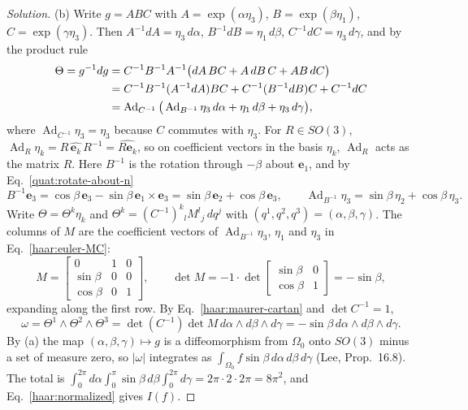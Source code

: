 \begin{proof}[Solution]
(b) Write $g=ABC$ with $A=\exp(\alpha\eta_3)$, $B=\exp(\beta\eta_1)$,
$C=\exp(\gamma\eta_3)$. Then $A^{-1}dA=\eta_3\,d\alpha$,
$B^{-1}dB=\eta_1\,d\beta$, $C^{-1}dC=\eta_3\,d\gamma$, and by the product
rule
\begin{align}
 \Theta=g^{-1}dg
 &=C^{-1}B^{-1}A^{-1}\big(dA\,BC+A\,dB\,C+AB\,dC\big)\notag\\
 &=C^{-1}B^{-1}(A^{-1}dA)BC+C^{-1}(B^{-1}dB)C+C^{-1}dC\notag\\
 &=\operatorname{Ad}_{C^{-1}}\big(\operatorname{Ad}_{B^{-1}}\eta_3\,d\alpha
   +\eta_1\,d\beta+\eta_3\,d\gamma\big),\label{haar:euler-MC}
\end{align}
where $\operatorname{Ad}_{C^{-1}}\eta_3=\eta_3$ because $C$ commutes with
$\eta_3$. For $R\in SO(3)$, $\operatorname{Ad}_R\eta_k=R\,\widehat{\mathbf e_k}
\,R^{-1}=\widehat{R\mathbf e_k}$, so on coefficient vectors in the basis
$\eta_k$, $\operatorname{Ad}_R$ acts as the matrix $R$. Here $B^{-1}$ is the
rotation through $-\beta$ about $\mathbf e_1$, and by
Eq.~\eqref{quat:rotate-about-n}
\begin{equation}
 B^{-1}\mathbf e_3=\cos\beta\,\mathbf e_3-\sin\beta\,\mathbf e_1\times\mathbf e_3
 =\sin\beta\,\mathbf e_2+\cos\beta\,\mathbf e_3,
 \qquad \operatorname{Ad}_{B^{-1}}\eta_3=\sin\beta\,\eta_2+\cos\beta\,\eta_3 .
\end{equation}
Write $\Theta=\Theta^k\eta_k$ and $\Theta^k=(C^{-1})^k{}_lM^l{}_j\,dq^j$ with
$(q^1,q^2,q^3)=(\alpha,\beta,\gamma)$. The columns of $M$ are the
coefficient vectors of $\operatorname{Ad}_{B^{-1}}\eta_3$, $\eta_1$ and
$\eta_3$ in Eq.~\eqref{haar:euler-MC}:
\begin{equation}\label{haar:euler-M}
 M=\begin{bmatrix}0&1&0\\ \sin\beta&0&0\\ \cos\beta&0&1\end{bmatrix},
 \qquad \det M=-1\cdot\det\begin{bmatrix}\sin\beta&0\\ \cos\beta&1\end{bmatrix}
 =-\sin\beta ,
\end{equation}
expanding along the first row. By Eq.~\eqref{haar:maurer-cartan} and
$\det C^{-1}=1$,
\begin{equation}\label{haar:euler-volume}
 \omega=\Theta^1\wedge\Theta^2\wedge\Theta^3
 =\det(C^{-1})\det M\,d\alpha\wedge d\beta\wedge d\gamma
 =-\sin\beta\,d\alpha\wedge d\beta\wedge d\gamma .
\end{equation}
By (a) the map $(\alpha,\beta,\gamma)\mapsto g$ is a diffeomorphism from
$\Omega_0$ onto $SO(3)$ minus a set of measure zero, so $|\omega|$ integrates
as $\int_{\Omega_0}f\sin\beta\,d\alpha\,d\beta\,d\gamma$ (Lee,
Prop.~16.8). The total is
$\int_0^{2\pi}d\alpha\int_0^\pi\sin\beta\,d\beta\int_0^{2\pi}d\gamma
=2\pi\cdot2\cdot2\pi=8\pi^2$, and Eq.~\eqref{haar:normalized} gives $I(f)$.
\end{proof}

